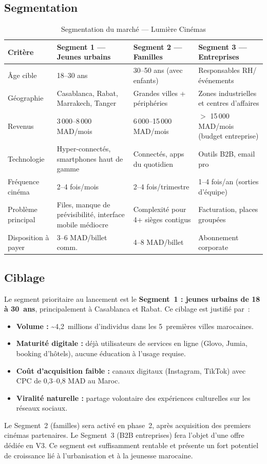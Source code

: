 \documentclass[12pt,a4paper,openany]{report}
\begin{document}
\subsection{Segmentation}

\begin{table}[H]
\centering
\small
\begin{tabularx}{\textwidth}{lXXX}
\toprule
\textbf{Critère} & \textbf{Segment 1 — Jeunes urbains} & \textbf{Segment 2 — Familles} & \textbf{Segment 3 — Entreprises} \\
\midrule
Âge cible        & 18–30 ans              & 30–50 ans (avec enfants)      & Responsables RH/événements \\
Géographie       & Casablanca, Rabat, Marrakech, Tanger & Grandes villes + périphéries & Zones industrielles et centres d'affaires \\
Revenus          & 3\,000–8\,000 MAD/mois & 6\,000–15\,000 MAD/mois       & $>$ 15\,000 MAD/mois (budget entreprise) \\
Technologie      & Hyper-connectés, smartphones haut de gamme & Connectés, apps du quotidien & Outils B2B, email pro \\
Fréquence cinéma & 2–4 fois/mois          & 2–4 fois/trimestre            & 1–4 fois/an (sorties d'équipe) \\
Problème principal& Files, manque de prévisibilité, interface mobile médiocre & Complexité pour 4+ sièges contigus & Facturation, places groupées \\
Disposition à payer & 3–6 MAD/billet comm. & 4–8 MAD/billet               & Abonnement corporate \\
\bottomrule
\end{tabularx}
\caption{Segmentation du marché — Lumière Cinémas}
\label{tab:segmentation}
\end{table}

\subsection{Ciblage}

Le segment prioritaire au lancement est le \textbf{Segment~1 : jeunes urbains de 18 à 30~ans}, principalement à Casablanca et Rabat. Ce ciblage est justifié par~:
\begin{itemize}
  \item \textbf{Volume :} \textasciitilde{}4,2~millions d'individus dans les 5~premières villes marocaines.
  \item \textbf{Maturité digitale :} déjà utilisateurs de services en ligne (Glovo, Jumia, booking d'hôtels), aucune éducation à l'usage requise.
  \item \textbf{Coût d'acquisition faible :} canaux digitaux (Instagram, TikTok) avec CPC de 0,3–0,8 MAD au Maroc.
  \item \textbf{Viralité naturelle :} partage volontaire des expériences culturelles sur les réseaux sociaux.
\end{itemize}
Le Segment~2 (familles) sera activé en phase~2, après acquisition des premiers cinémas partenaires. Le Segment~3 (B2B entreprises) fera l'objet d'une offre dédiée en V3. Ce segment est suffisamment rentable et présente un fort potentiel de croissance lié à l'urbanisation et à la jeunesse marocaine.
\end{document}
